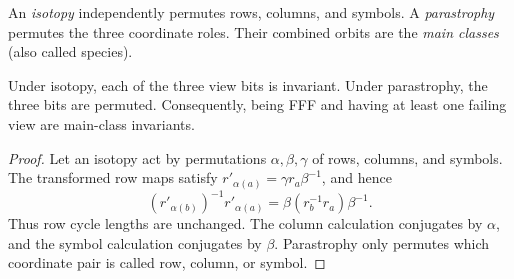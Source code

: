 An \emph{isotopy} independently permutes rows, columns, and symbols.  A
\emph{parastrophy} permutes the three coordinate roles.  Their combined
orbits are the \emph{main classes} (also called species).

\begin{proposition}\label{prop:invariance}
Under isotopy, each of the three view bits is invariant.  Under parastrophy,
the three bits are permuted.  Consequently, being FFF and having at least one
failing view are main-class invariants.
\end{proposition}

\begin{proof}
Let an isotopy act by permutations $\alpha,\beta,\gamma$ of rows, columns,
and symbols.  The transformed row maps satisfy
$r'_{\alpha(a)}=\gamma r_a\beta^{-1}$, and hence
\[
 (r'_{\alpha(b)})^{-1}r'_{\alpha(a)}
   =\beta(r_b^{-1}r_a)\beta^{-1}.
\]
Thus row cycle lengths are unchanged.  The column calculation conjugates by
$\alpha$, and the symbol calculation conjugates by $\beta$.  Parastrophy
only permutes which coordinate pair is called row, column, or symbol.
\end{proof}
